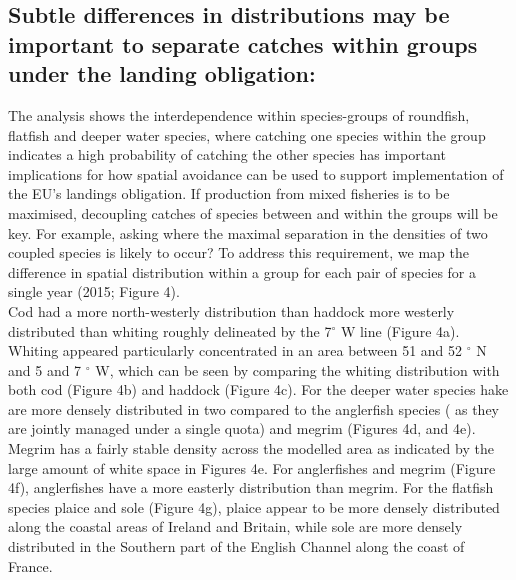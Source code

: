 \documentclass[fleqn,10pt]{wlscirep}
\begin{document}
\begin{linenumbers}
\subsection*{Subtle differences in distributions may be important to separate
	catches within groups under the landing obligation:\\} The analysis
shows the interdependence within  species-groups of
roundfish, flatfish and deeper water species, where catching one species within
the group indicates a high probability of catching the other
species has important implications for how
spatial avoidance can be used to support implementation of the EU's landings
obligation. If production from mixed fisheries is to be maximised, decoupling
catches of species between and within the groups will be key. For example,
asking where the maximal separation in the densities of two coupled species is
likely to occur? To address this requirement, we map the difference in spatial
distribution within a group for each pair of
species for a single year (2015;
Figure 4). \\

Cod had a more north-westerly distribution than haddock  more westerly distributed than whiting roughly
delineated by the 7$^{\circ}$ W line (Figure 4a). Whiting appeared particularly
concentrated in an area between 51 and 52 $^{\circ}$ N and 5 and 7 $^{\circ}$
W, which can be seen by comparing the whiting distribution with both cod
(Figure 4b) and haddock (Figure 4c). For the deeper water species hake are more
densely distributed in two  compared to the anglerfish species
( as they are jointly managed under a single quota) and megrim
(Figures 4d, and
4e). Megrim has a fairly stable density across the modelled area as indicated
by the large amount of white space in Figures 4e. For anglerfishes and megrim
(Figure 4f), anglerfishes have a more easterly distribution than megrim.  For
the flatfish species plaice and sole (Figure 4g), plaice appear to be more
densely distributed along the coastal areas of Ireland and Britain, while sole
are more densely distributed in the Southern part of the English Channel along
the coast of France.\\


\end{linenumbers}
\end{document}
